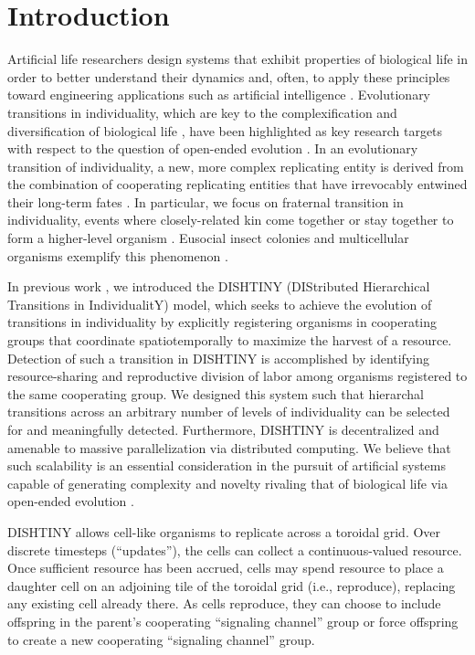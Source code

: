 \section{Introduction}

Artificial life researchers design systems that exhibit properties of biological life in order to better understand their dynamics and, often, to apply these principles toward engineering applications such as artificial intelligence \cite{bedau2003artificial}.
Evolutionary transitions in individuality, which are key to the complexification and diversification of biological life \cite{smith1997major}, have been highlighted as key research targets with respect to the question of open-ended evolution \cite{ray1996evolving, banzhaf2016defining}.
In an evolutionary transition of individuality, a new, more complex replicating entity is derived from the combination of cooperating replicating entities that have irrevocably entwined their long-term fates \cite{west2015major}.
In particular, we focus on fraternal transition in individuality, events where closely-related kin come together or stay together to form a higher-level organism \cite{queller1997cooperators}.
Eusocial insect colonies and multicellular organisms exemplify this phenomenon \cite{smith1997major}.



In previous work \cite{moreno2018toward}, we introduced the DISHTINY (DIStributed Hierarchical Transitions in IndividualitY) model, which seeks to achieve the evolution of transitions in individuality by explicitly registering organisms in cooperating groups that coordinate spatiotemporally to maximize the harvest of a resource.
Detection of such a transition in DISHTINY is accomplished by identifying resource-sharing and reproductive division of labor among organisms registered to the same cooperating group.
We designed this system such that hierarchal transitions across an arbitrary number of levels of individuality can be selected for and meaningfully detected.
Furthermore, DISHTINY is decentralized and amenable to massive parallelization via distributed computing.
We believe that such scalability is an essential consideration in the pursuit of artificial systems capable of generating complexity and novelty rivaling that of biological life via open-ended evolution \cite{ackley2011pursue, ackley2016indefinite}.

DISHTINY allows cell-like organisms to replicate across a toroidal grid.
Over discrete timesteps (``updates''), the cells can collect a continuous-valued resource.
Once sufficient resource has been accrued, cells may spend resource to place a daughter cell on an adjoining tile of the toroidal grid (i.e., reproduce), replacing any existing cell already there.
As cells reproduce, they can choose to include offspring in the parent's cooperating ``signaling channel'' group or force offspring to create a new cooperating ``signaling channel'' group.


